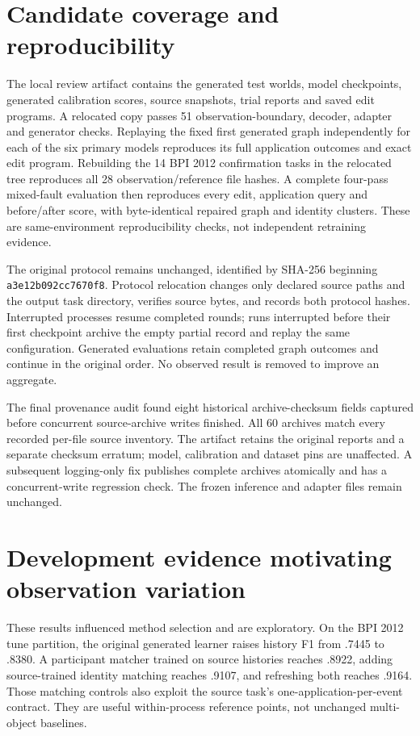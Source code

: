 \documentclass[11pt]{article}
\begin{document}
\section{Candidate coverage and reproducibility}





The local review artifact contains the generated test worlds, model checkpoints, generated calibration scores, source snapshots, trial reports and saved edit programs. A relocated copy passes 51 observation-boundary, decoder, adapter and generator checks. Replaying the fixed first generated graph independently for each of the six primary models reproduces its full application outcomes and exact edit program. Rebuilding the 14 BPI 2012 confirmation tasks in the relocated tree reproduces all 28 observation/reference file hashes. A complete four-pass mixed-fault evaluation then reproduces every edit, application query and before/after score, with byte-identical repaired graph and identity clusters. These are same-environment reproducibility checks, not independent retraining evidence.

The original protocol remains unchanged, identified by SHA-256 beginning \texttt{a3e12b092cc7670f8}. Protocol relocation changes only declared source paths and the output task directory, verifies source bytes, and records both protocol hashes. Interrupted processes resume completed rounds; runs interrupted before their first checkpoint archive the empty partial record and replay the same configuration. Generated evaluations retain completed graph outcomes and continue in the original order. No observed result is removed to improve an aggregate.

The final provenance audit found eight historical archive-checksum fields captured before concurrent source-archive writes finished. All 60 archives match every recorded per-file source inventory. The artifact retains the original reports and a separate checksum erratum; model, calibration and dataset pins are unaffected. A subsequent logging-only fix publishes complete archives atomically and has a concurrent-write regression check. The frozen inference and adapter files remain unchanged.

\section{Development evidence motivating observation variation}
\label{sec:development}
These results influenced method selection and are exploratory. On the BPI 2012 tune partition, the original generated learner raises history F1 from .7445 to .8380. A participant matcher trained on source histories reaches .8922, adding source-trained identity matching reaches .9107, and refreshing both reaches .9164. Those matching controls also exploit the source task's one-application-per-event contract. They are useful within-process reference points, not unchanged multi-object baselines.
\end{document}
